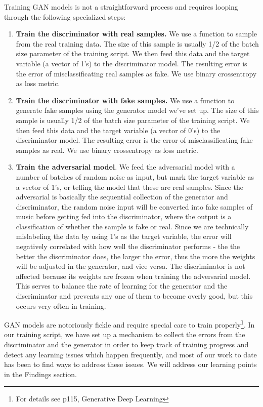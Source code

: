 \documentclass[12pt,oneside]{chicagocapstone}
\providecommand{\tightlist}{%
  \setlength{\itemsep}{0pt}\setlength{\parskip}{0pt}}
\begin{document}
Training GAN models is not a straightforward process and requires looping through the following specialized steps:
\begin{enumerate}
\def\labelenumi{\arabic{enumi}.}
\tightlist
\item
  \textbf{Train the discriminator with real samples.} We use a function to sample from the real training data. The size of this sample is usually 1/2 of the batch size parameter of the training script. We then feed this data and the target variable (a vector of 1's) to the discriminator model. The resulting error is the error of misclassificating real samples as fake. We use binary crossentropy as loss metric.
\item
  \textbf{Train the discriminator with fake samples.} We use a function to generate fake samples using the generator model we've set up. The size of this sample is usually 1/2 of the batch size parameter of the training script. We then feed this data and the target variable (a vector of 0's) to the discriminator model. The resulting error is the error of misclassificating fake samples as real. We use binary crossentropy as loss metric.
\item
  \textbf{Train the adversarial model}. We feed the adversarial model with a number of batches of random noise as input, but mark the target variable as a vector of 1's, or telling the model that these are real samples. Since the adversarial is basically the sequential collection of the generator and discriminator, the random noise input will be converted into fake samples of music before getting fed into the discriminator, where the output is a classification of whether the sample is fake or real. Since we are technically mislabeling the data by using 1's as the target variable, the error will negatively correlated with how well the discriminator performs - the the better the discriminator does, the larger the error, thus the more the weights will be adjusted in the generator, and vice versa. The discriminator is not affected because its weights are frozen when training the adversarial model. This serves to balance the rate of learning for the generator and the discriminator and prevents any one of them to become overly good, but this occurs very often in training.
\end{enumerate}
GAN models are notoriously fickle and require special care to train properly\footnote{For details see p115, Generative Deep Learning}. In our training script, we have set up a mechanism to collect the errors from the discriminator and the generator in order to keep track of training progress and detect any learning issues which happen frequently, and most of our work to date has been to find ways to address these issues. We will address our learning points in the Findings section.
\end{document}
